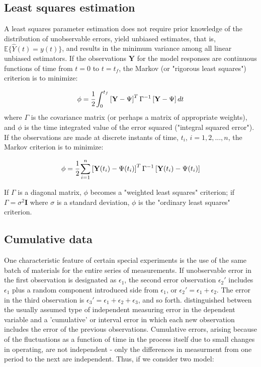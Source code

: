 \documentclass[a4paper,fleqn]{cas-dc}
\begin{document}
\subsection{Least squares estimation}
A least squares parameter estimation does not require prior knowledge of the distribution of unobservable errors, yield  unbiased estimates, that is, $ \mathbb{E}\{\hat{Y}(t) = y(t) \} $, and results in the minimum variance among all linear unbiased estimators. If the observations $\textbf{Y}$ for the model responses are continuous functions of time from $t = 0$ to $t = t_f$, the Markov (or "rigorous least squares") criterion is to minimize:

{\footnotesize
\begin{equation}
	\phi =  \cfrac{1}{2} \int_{0}^{t_f}  \left[ \textbf{Y} - \Psi \right]^T \Gamma^{-1} \left[ \textbf{Y} - \Psi \right] dt
\end{equation} }
where $\Gamma$ is the covariance matrix (or perhaps a matrix of appropriate weights), and $\phi$ is the time integrated value of the error squared ("integral squared error"). If the observations are made at discrete instants of time, $t_i$, $i = 1,2,...,n$, the Markov criterion is to minimize:

{\footnotesize
\begin{equation}
	\phi = \cfrac{1}{2} \sum_{i=1}^{n} \left[ \textbf{Y}(t_i) - \Psi(t_i) \right]^T \Gamma^{-1} \left[ \textbf{Y}(t_i) - \Psi(t_i) \right] 
\end{equation} }

If $\Gamma$ is a diagonal matrix, $\phi$  becomes a "weighted least squares" criterion; if $\Gamma = \sigma^2 \textbf{I}$ where $\sigma$ is a standard deviation, $\phi$ is the "ordinary least squares" criterion.

\subsection{Cumulative data}

One characteristic feature of certain special experiments is the use of the same batch of materials for the entire series of measurements. If unobservable error in the first observation is designated as $\epsilon_1$, the second error observation $\epsilon_2'$ includes $\epsilon_1$ plus a random component introduced side from $\epsilon_1$, or $\epsilon_2' = \epsilon_1 + \epsilon_2$. The error in the third observation is $\epsilon_3' = \epsilon_1 + \epsilon_2 + \epsilon_3$, and so forth. \citet{Mandel1957} distinguished between the usually assumed type of independent measuring error in the dependent variable and a 'cumulative' or interval error in which each new observation includes the error of the previous observations. Cumulative errors, arising because of the fluctuations as a function of time in the process itself due to small changes in operating, are not independent - only the differences in measurment from one period to the next are independent. Thus, if we consider two model:
\end{document}

